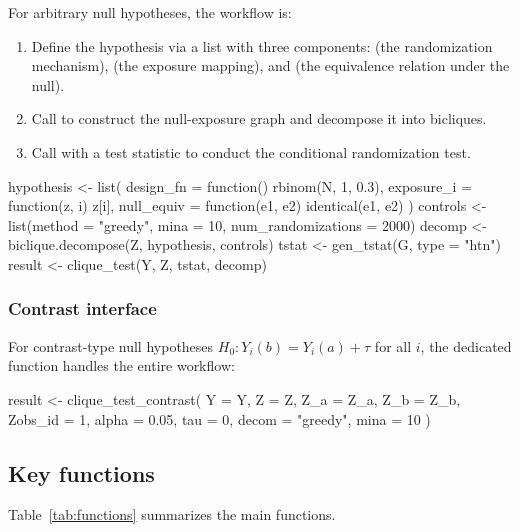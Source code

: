 \documentclass[article]{jss}
\begin{document}
For arbitrary null hypotheses, the workflow is:
\begin{enumerate}
  \item Define the hypothesis via a list with three components:
         (the randomization mechanism), 
        (the exposure mapping), and  (the equivalence
        relation under the null).
  \item Call  to construct the null-exposure
        graph and decompose it into bicliques.
  \item Call  with a test statistic to conduct the
        conditional randomization test.
\end{enumerate}

\begin{Code}
hypothesis <- list(
  design_fn  = function() rbinom(N, 1, 0.3),
  exposure_i = function(z, i) z[i],
  null_equiv = function(e1, e2) identical(e1, e2)
)
controls <- list(method = "greedy", mina = 10, num_randomizations = 2000)
decomp <- biclique.decompose(Z, hypothesis, controls)
tstat  <- gen_tstat(G, type = "htn")
result <- clique_test(Y, Z, tstat, decomp)
\end{Code}

\subsubsection{Contrast interface}

For contrast-type null hypotheses $H_0: Y_i(b) = Y_i(a) + \tau$ for all
$i$, the dedicated function  handles the
entire workflow:

\begin{Code}
result <- clique_test_contrast(
  Y = Y, Z = Z, Z_a = Z_a, Z_b = Z_b,
  Zobs_id = 1, alpha = 0.05, tau = 0,
  decom = "greedy", mina = 10
)
\end{Code}

\subsection{Key functions}

Table~\ref{tab:functions} summarizes the main functions.
\end{document}
